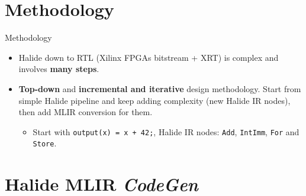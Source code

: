 \documentclass[8pt,a4paper,oneside,hidelinks,aspectratio=169,dvipsnames]{beamer}
\newcommand{\codecpp}[1]{\texttt{#1}}
\begin{document}
\section{Methodology}

\begin{frame}{Methodology}
  \begin{itemize}
    \item Halide down to RTL (Xilinx FPGAs bitstream + XRT) is complex and involves \textbf{many steps}.
    \item \textbf{Top-down} and \textbf{incremental and iterative} design methodology. Start from simple Halide pipeline and keep adding complexity (new Halide IR nodes), then add MLIR conversion for them.
          \begin{itemize}
            \item Start with \codecpp{output(x) = x + 42;}, Halide IR nodes: \codecpp{Add}, \codecpp{IntImm}, \codecpp{For} and \codecpp{Store}.
          \end{itemize}
  \end{itemize}
  \begin{figure}
    \centering
    \scalebox{.36}{}
  \end{figure}
\end{frame}

\section{Halide MLIR \textit{CodeGen}}
\end{document}

